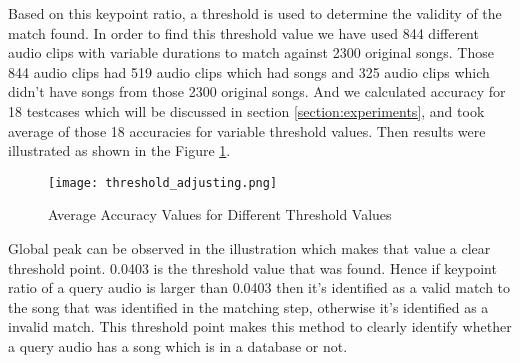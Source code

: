 Based on this keypoint ratio, a threshold is used to determine the validity of the match found. In order to find this
threshold value we have used 844 different audio clips with variable durations to match against 2300 original songs.
Those 844 audio clips had 519 audio clips which had songs and 325 audio clips which didn't have songs from those 
2300 original songs. And we calculated accuracy for 18 testcases which will be discussed in section 
\ref{section:experiments}, and took average of those 18 accuracies for variable threshold values. Then results were
illustrated as shown in the Figure \ref{fig:threshold}. 

\begin{figure}[h]
  \centering
  \texttt{[image: threshold\_adjusting.png]}
  \caption{Average Accuracy Values for Different Threshold Values}
  \label{fig:threshold}
\end{figure}

Global peak can be observed in the illustration which makes that value a clear threshold point. 0.0403 is the threshold
value that was found. Hence if keypoint ratio of a query audio is larger than 0.0403 then it's identified as a valid match
to the song that was identified in the matching step, otherwise it's identified as a invalid match. This threshold point
makes this method to clearly identify whether a query audio has a song which is in a database or not.
